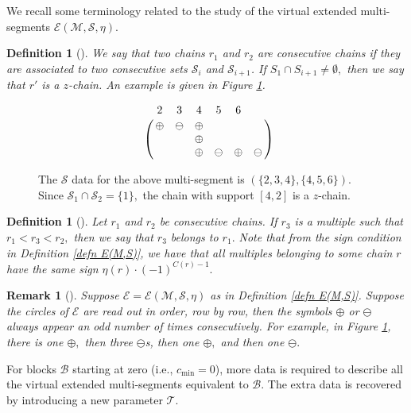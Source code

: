 \documentclass[11pt,letterpaper]{amsart}
\newcommand{\EE}{\mathcal{E}}
\newtheorem{defn}[thm]{Definition}
\newtheorem{rmk}[thm]{Remark}
\numberwithin{equation}{section}
\begin{document}
We recall some terminology related to the study of the virtual extended multi-segments $\EE(\mathcal{M},\mathcal{S},\eta).$

\begin{defn}[{\cite[Definition 5.4]{HKT26}}]
\label{def z-chain}
    We say that two chains $r_1$ and $r_2$ are \emph{consecutive chains} if they are associated to two consecutive sets $\mathcal{S}_i$ and $\mathcal{S}_{i + 1}$. If $S_1 \cap S_{i + 1} \neq \emptyset,$ then we say that $r'$ is a \emph{$z$-chain}. An example is given in Figure \ref{fig: z-chain}.
\end{defn}

\begin{figure}[h]
    \centering
    $$\bordermatrix{&2 &3 & 4 & 5 & 6 \cr & \oplus & \ominus & \oplus \cr & & & \oplus \cr && & \oplus & \ominus & \oplus & \ominus}$$
    \caption{The $\mathcal{S}$ data for the above multi-segment is $(\{2, 3, 4\}, \{4, 5, 6\}).$ Since $\mathcal{S}_1 \cap \mathcal{S}_2 = \{1\},$ the chain with support $[4, 2]$ is a $z$-chain.}
    \label{fig: z-chain}
\end{figure}
    
\begin{defn}[{\cite[Definition 5.6]{HKT26}}]
\label{def multiples belonging to a chain}
    Let $r_1$ and $r_2$ be consecutive chains. If $r_3$ is a multiple such that $r_1 < r_3 < r_2,$ then we say that $r_3$ \emph{belongs} to $r_1.$ Note that from the sign condition in Definition \ref{defn E(M,S)}, we have that all multiples belonging to some chain $r$ have the same sign $\eta(r) \cdot (-1)^{C(r) - 1}.$
\end{defn}


\begin{rmk}[{\cite[Remark 5.8]{HKT26}}]\label{rmk odd signs}
    Suppose $\mathcal{E} = \mathcal{E}(\mathcal{M}, \mathcal{S}, \eta)$ as in Definition \ref{defn E(M,S)}. Suppose the circles of $\mathcal{E}$ are read out in order, row by row, then the symbols $\oplus$ or $\ominus$ always appear an odd number of times consecutively. For example, in Figure \ref{fig: z-chain}, there is one $\oplus,$ then three $\ominus$s, then one $\oplus,$ and then one $\ominus.$
\end{rmk}

For blocks $\mathcal{B}$ starting at zero (i.e., $c_{\min} = 0$), more data is required to describe all the virtual extended multi-segments equivalent to $\mathcal{B}.$ 
The extra data is recovered by introducing a new parameter $\mathcal{T}.$
\end{document}
